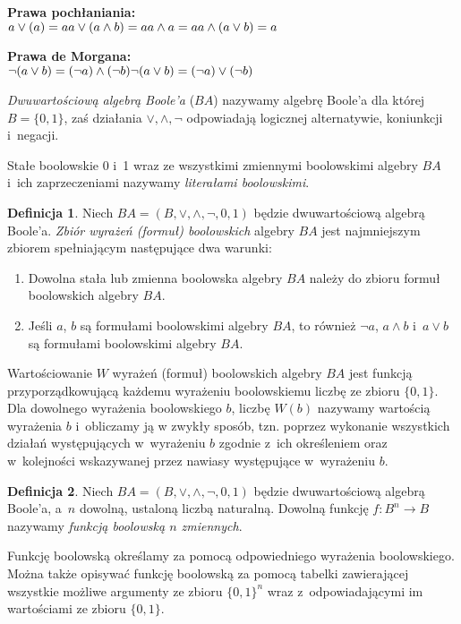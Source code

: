 \documentclass[a4paper,11pt,twoside]{article}
\theoremstyle{definition}
\newtheorem{df}{Definicja}
\begin{document}
\noindent
{\bf Prawa pochłaniania:} \\
$
a \vee (a) = a \\
a \vee (a \wedge b) = a\\
a \wedge a = a\\
a \wedge  (a \vee b) = a
$

{\bf Prawa de Morgana:} \\
$
\neg (a \vee b) = (\neg a) \wedge (\neg b) \\
\neg (a \vee b) = (\neg a) \vee (\neg b)\\
$


{\em Dwuwartościową algebrą Boole'a} ($\mathit{BA}$) nazywamy algebrę Boole'a dla której $B=\{0,1\}$, zaś działania $\vee,\wedge,\neg$ odpowiadają logicznej alternatywie, koniunkcji i~negacji.

Stałe boolowskie 0 i~1 wraz ze wszystkimi zmiennymi boolowskimi algebry $\mathit{BA}$ i~ich zaprzeczeniami nazywamy {\em literałami boolowskimi}. 
\begin{df}
Niech $\mathit{BA} = (B,\vee,\wedge,\neg,0,1)$ będzie dwuwartościową algebrą Boole'a. {\em Zbiór wyrażeń (formuł) boolowskich}  algebry $\mathit{BA}$ jest najmniejszym zbiorem spełniającym następujące dwa warunki:
\begin{enumerate}

\item Dowolna stała lub zmienna boolowska algebry $\mathit{BA}$ należy do zbioru formuł boolowskich algebry $\mathit{BA}$.

\item Jeśli $a$, $b$ są formułami boolowskimi algebry $\mathit{BA}$, to również $\neg a$, $a \wedge b$ i~$a \vee b$ są formułami boolowskimi algebry $\mathit{BA}$.
\end{enumerate}
\end{df}

Wartościowanie $W$ wyrażeń (formuł) boolowskich algebry $\mathit{BA}$ jest funkcją przyporządkowującą każdemu wyrażeniu boolowskiemu liczbę ze zbioru $\{0,1\}$. Dla dowolnego wyrażenia boolowskiego $b$, liczbę $W(b)$ nazywamy wartością wyrażenia $b$ i~obliczamy ją w zwykły sposób, tzn. poprzez wykonanie wszystkich działań występujących w~wyrażeniu $b$ zgodnie z~ich określeniem oraz w~kolejności wskazywanej przez nawiasy występujące w~wyrażeniu $b$.\\

\begin{df}
Niech $\mathit{BA} = (B,\vee,\wedge,\neg,0,1)$ będzie dwuwartościową algebrą Boole'a, a~$n$ dowolną, ustaloną liczbą naturalną. Dowolną funkcję $f\colon B^n \to B$ nazywamy {\em funkcją boolowską $n$ zmiennych}.
\end{df}
Funkcję boolowską określamy za pomocą odpowiedniego wyrażenia boolowskiego. Można także opisywać funkcję boolowską za pomocą tabelki zawierającej wszystkie możliwe argumenty ze zbioru $\{0,1\}^n$ wraz z~odpowiadającymi im wartościami ze zbioru $\{0,1\}$.
\end{document}
